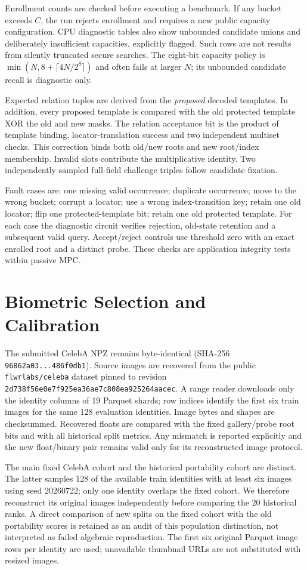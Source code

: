 \documentclass[journal,onecolumn]{IEEEtran}
\begin{document}
Enrollment counts are checked before executing a benchmark. If any bucket exceeds $C$, the run rejects enrollment and requires a new public capacity configuration. CPU diagnostic tables also show unbounded candidate unions and deliberately insufficient capacities, explicitly flagged. Such rows are not results from silently truncated secure searches. The eight-bit capacity policy is $\min(N,8+\lceil4N/2^8\rceil)$ and often fails at larger $N$; its unbounded candidate recall is diagnostic only.

Expected relation tuples are derived from the \emph{proposed} decoded templates. In addition, every proposed template is compared with the old protected template XOR the old and new masks. The relation acceptance bit is the product of template binding, locator-translation success and two independent multiset checks. This correction binds both old/new roots and new root/index membership. Invalid slots contribute the multiplicative identity. Two independently sampled full-field challenge triples follow candidate fixation.

Fault cases are: one missing valid occurrence; duplicate occurrence; move to the wrong bucket; corrupt a locator; use a wrong index-transition key; retain one old locator; flip one protected-template bit; retain one old protected template. For each case the diagnostic circuit verifies rejection, old-state retention and a subsequent valid query. Accept/reject controls use threshold zero with an exact enrolled root and a distinct probe. These checks are application integrity tests within passive MPC.

\section{Biometric Selection and Calibration}\label{suppsec:supplement:6}
The submitted CelebA NPZ remains byte-identical (SHA-256 \texttt{96862a03...486f0db1}). Source images are recovered from the public \texttt{flwrlabs/celeba} dataset pinned to revision \texttt{2d738f56e0e7f925ea36ae7c808ea925264aacec}. A range reader downloads only the identity columns of 19 Parquet shards; row indices identify the first six train images for the same 128 evaluation identities. Image bytes and shapes are checksummed. Recovered floats are compared with the fixed gallery/probe root bits and with all historical split metrics. Any mismatch is reported explicitly and the new float/binary pair remains valid only for its reconstructed image protocol.

The main fixed CelebA cohort and the historical portability cohort are distinct. The latter samples 128 of the available train identities with at least six images using seed 20260722; only one identity overlaps the fixed cohort. We therefore reconstruct its original images independently before comparing the 20 historical ranks. A direct comparison of new splits on the fixed cohort with the old portability scores is retained as an audit of this population distinction, not interpreted as failed algebraic reproduction. The first six original Parquet image rows per identity are used; unavailable thumbnail URLs are not substituted with resized images.
\end{document}
